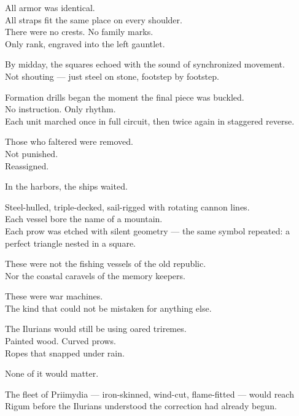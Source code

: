 \documentclass[9pt]{article}
\begin{document}
All armor was identical.\\
All straps fit the same place on every shoulder.\\
There were no crests. No family marks.\\
Only rank, engraved into the left gauntlet.

\vspace{1em}

By midday, the squares echoed with the sound of synchronized movement.\\
Not shouting — just steel on stone, footstep by footstep.

Formation drills began the moment the final piece was buckled.\\
No instruction. Only rhythm.\\
Each unit marched once in full circuit, then twice again in staggered reverse.

Those who faltered were removed.\\
Not punished.\\
Reassigned.

\vspace{1em}

In the harbors, the ships waited.

Steel-hulled, triple-decked, sail-rigged with rotating cannon lines.\\
Each vessel bore the name of a mountain.\\
Each prow was etched with silent geometry — the same symbol repeated: a perfect triangle nested in a square.

These were not the fishing vessels of the old republic.\\
Nor the coastal caravels of the memory keepers.

These were war machines.\\
The kind that could not be mistaken for anything else.

\vspace{1em}

The Ilurians would still be using oared triremes.\\
Painted wood. Curved prows.\\
Ropes that snapped under rain.

None of it would matter.

The fleet of Priimydia — iron-skinned, wind-cut, flame-fitted — would reach Rigum before the Ilurians understood the correction had already begun.

\vspace{1em}
\end{document}
